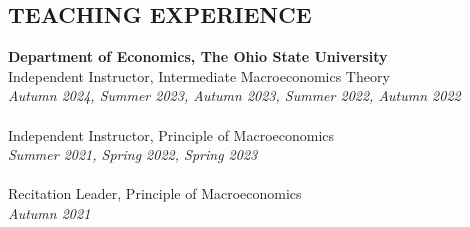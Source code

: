 \documentclass[12pt]{res} %
\begin{document}
\begin{resume}
\section{TEACHING EXPERIENCE}%
\label{sec:teaching_experience}
\vspace{8pt} %
{\bf Department of Economics, The Ohio State University} \\
Independent Instructor, Intermediate Macroeconomics Theory \\
\hspace*{\fill} \textit{Autumn 2024, Summer 2023, Autumn 2023, Summer 2022, Autumn 2022} \\
\\
Independent Instructor, Principle of Macroeconomics \\
\hspace*{\fill} \textit{Summer 2021, Spring 2022, Spring 2023} \\
\\
Recitation Leader, Principle of Macroeconomics \\
\hspace*{\fill} \textit{Autumn 2021}





%
%


\end{resume}
\end{document}
